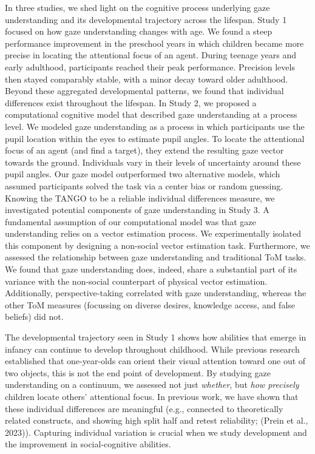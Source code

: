 \documentclass[
  man,mask,floatsintext]{apa7}
\begin{document}
In three studies, we shed light on the cognitive process underlying gaze understanding and its developmental trajectory across the lifespan. Study 1 focused on how gaze understanding changes with age. We found a steep performance improvement in the preschool years in which children became more precise in locating the attentional focus of an agent. During teenage years and early adulthood, participants reached their peak performance. Precision levels then stayed comparably stable, with a minor decay toward older adulthood. Beyond these aggregated developmental patterns, we found that individual differences exist throughout the lifespan. In Study 2, we proposed a computational cognitive model that described gaze understanding at a process level. We modeled gaze understanding as a process in which participants use the pupil location within the eyes to estimate pupil angles. To locate the attentional focus of an agent (and find a target), they extend the resulting gaze vector towards the ground. Individuals vary in their levels of uncertainty around these pupil angles. Our gaze model outperformed two alternative models, which assumed participants solved the task via a center bias or random guessing. Knowing the TANGO to be a reliable individual differences measure, we investigated potential components of gaze understanding in Study 3. A fundamental assumption of our computational model was that gaze understanding relies on a vector estimation process. We experimentally isolated this component by designing a non-social vector estimation task. Furthermore, we assessed the relationship between gaze understanding and traditional ToM tasks. We found that gaze understanding does, indeed, share a substantial part of its variance with the non-social counterpart of physical vector estimation. Additionally, perspective-taking correlated with gaze understanding, whereas the other ToM measures (focussing on diverse desires, knowledge access, and false beliefs) did not.

The developmental trajectory seen in Study 1 shows how abilities that emerge in infancy can continue to develop throughout childhood. While previous research established that one-year-olds can orient their visual attention toward one out of two objects, this is not the end point of development. By studying gaze understanding on a continuum, we assessed not just \emph{whether}, but \emph{how precisely} children locate others' attentional focus. In previous work, we have shown that these individual differences are meaningful (e.g., connected to theoretically related constructs, and showing high split half and retest reliability; (Prein et al., 2023)). Capturing individual variation is crucial when we study development and the improvement in social-cognitive abilities.
\end{document}
